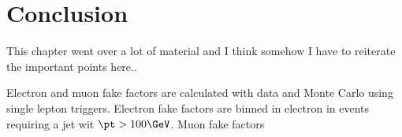  
 
 \FloatBarrier
 \section{Conclusion}
 \label{sec:FFcon}
 This chapter went over a lot of material and I think somehow I have to reiterate the important points here..

Electron and muon fake factors are calculated with data and Monte Carlo using single lepton triggers.  Electron fake factors are binned in electron \pt in events requiring a jet wit $\pt > 100\GeV$.  Muon fake factors 
